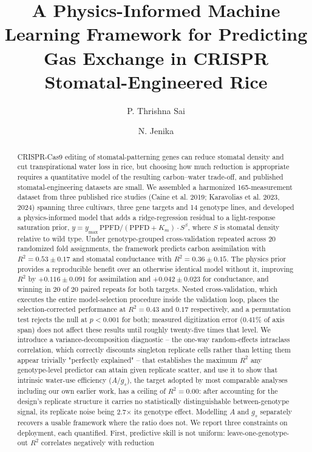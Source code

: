 \documentclass[runningheads]{llncs}
\begin{document}
\title{A Physics-Informed Machine Learning Framework for Predicting Gas Exchange in CRISPR Stomatal-Engineered Rice}
\author{P. Thrishna Sai \and N. Jenika}
\maketitle
\begin{abstract}
CRISPR-Cas9 editing of stomatal-patterning genes can reduce stomatal density and cut transpirational water loss in rice, but choosing how much reduction is appropriate requires a quantitative model of the resulting carbon--water trade-off, and published stomatal-engineering datasets are small. We assembled a harmonized 165-measurement dataset from three published rice studies (Caine et al. 2019; Karavolias et al. 2023, 2024) spanning three cultivars, three gene targets and 14 genotype lines, and developed a physics-informed model that adds a ridge-regression residual to a light-response saturation prior, $y = y_{\max}\,\mathrm{PPFD}/(\mathrm{PPFD}+K_m)\cdot S^{\beta}$, where $S$ is stomatal density relative to wild type. Under genotype-grouped cross-validation repeated across 20 randomized fold assignments, the framework predicts carbon assimilation with $R^{2}=0.53\pm0.17$ and stomatal conductance with $R^{2}=0.36\pm0.15$. The physics prior provides a reproducible benefit over an otherwise identical model without it, improving $R^{2}$ by $+0.116\pm0.091$ for assimilation and $+0.042\pm0.023$ for conductance, and winning in 20 of 20 paired repeats for both targets. Nested cross-validation, which executes the entire model-selection procedure inside the validation loop, places the selection-corrected performance at $R^{2}=0.43$ and $0.17$ respectively, and a permutation test rejects the null at $p<0.001$ for both; measured digitization error (0.41\% of axis span) does not affect these results until roughly twenty-five times that level. We introduce a variance-decomposition diagnostic -- the one-way random-effects intraclass correlation, which correctly discounts singleton replicate cells rather than letting them appear trivially "perfectly explained" -- that establishes the maximum $R^{2}$ any genotype-level predictor can attain given replicate scatter, and use it to show that intrinsic water-use efficiency ($A/g_s$), the target adopted by most comparable analyses including our own earlier work, has a ceiling of $R^{2}=0.00$: after accounting for the design's replicate structure it carries no statistically distinguishable between-genotype signal, its replicate noise being 2.7$\times$ its genotype effect. Modelling $A$ and $g_s$ separately recovers a usable framework where the ratio does not. We report three constraints on deployment, each quantified. First, predictive skill is not uniform: leave-one-genotype-out $R^{2}$ correlates negatively with reduction 
\end{abstract}
\end{document}
